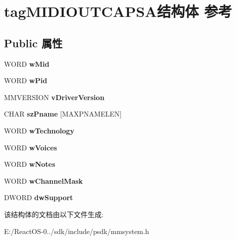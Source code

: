 \hypertarget{structtag_m_i_d_i_o_u_t_c_a_p_s_a}{}\section{tag\+M\+I\+D\+I\+O\+U\+T\+C\+A\+P\+S\+A结构体 参考}
\label{structtag_m_i_d_i_o_u_t_c_a_p_s_a}
\subsection*{Public 属性}
\begin{DoxyCompactItemize}
\item 
\mbox{\label{structtag_m_i_d_i_o_u_t_c_a_p_s_a_a0c84c994c5dac53b035b5d5ba0dc77a8}} 
W\+O\+RD {\bfseries w\+Mid}
\item 
\mbox{\label{structtag_m_i_d_i_o_u_t_c_a_p_s_a_a65f5a560c442c4b85eb6024ad4702cd7}} 
W\+O\+RD {\bfseries w\+Pid}
\item 
\mbox{\label{structtag_m_i_d_i_o_u_t_c_a_p_s_a_a52d7a03a9c51aa8c40cfa6502131436f}} 
M\+M\+V\+E\+R\+S\+I\+ON {\bfseries v\+Driver\+Version}
\item 
\mbox{\label{structtag_m_i_d_i_o_u_t_c_a_p_s_a_aba0bcb97646b3524abea691d318c9d6b}} 
C\+H\+AR {\bfseries sz\+Pname} \mbox{[}M\+A\+X\+P\+N\+A\+M\+E\+L\+EN\mbox{]}
\item 
\mbox{\label{structtag_m_i_d_i_o_u_t_c_a_p_s_a_ac60c8ce589e4a89d18493cd1204a280e}} 
W\+O\+RD {\bfseries w\+Technology}
\item 
\mbox{\label{structtag_m_i_d_i_o_u_t_c_a_p_s_a_a120f759de91cd1316fd716f027b1ddc0}} 
W\+O\+RD {\bfseries w\+Voices}
\item 
\mbox{\label{structtag_m_i_d_i_o_u_t_c_a_p_s_a_a17483a74119ee3831907b6535b1d5623}} 
W\+O\+RD {\bfseries w\+Notes}
\item 
\mbox{\label{structtag_m_i_d_i_o_u_t_c_a_p_s_a_ac43d4dd94c081db657bdac028de5835b}} 
W\+O\+RD {\bfseries w\+Channel\+Mask}
\item 
\mbox{\label{structtag_m_i_d_i_o_u_t_c_a_p_s_a_acc98e5bd6c70e0ba31a2b6cac8c6541d}} 
D\+W\+O\+RD {\bfseries dw\+Support}
\end{DoxyCompactItemize}


该结构体的文档由以下文件生成\+:\begin{DoxyCompactItemize}
\item 
E\+:/\+React\+O\+S-\/0../sdk/include/psdk/mmsystem.\+h\end{DoxyCompactItemize}
